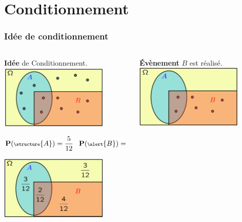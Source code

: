 \documentclass{beamer}
\begin{document}
\section{Conditionnement}

\begin{frame}[t]
    \frametitle{Idée de conditionnement}
    \begin{columns}
        \begin{column}{0.5\textwidth}
{
        \centering
        \textbf{Idée} de Conditionnement.\\
        \includegraphics[width=0.8\textwidth]{./cond_first_example_1_1.png}

        $$
        \scriptsize
        \mathbf{P}(\structure{A}) =  \frac{5}{12}\quad \mathbf{P}(\alert{B}) =  \frac{6}{12}
        $$
}

{
        \centering
        \includegraphics[width=0.8\textwidth]{./cond_first_example_1_3.png}

}
        \end{column}
        \begin{column}{0.5\textwidth}
            
{
        \centering
        \textbf{Évènement} $B$ est réalisé.\\
        \includegraphics[width=0.8\textwidth]{./cond_first_example_1_2.png}

}
\end{column}
\end{columns}
\end{frame}
\end{document}
